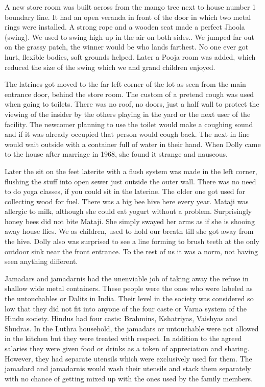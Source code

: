 A new store room was built across from the mango tree next to house number 1 boundary line. It had an open veranda in front of the door in which two metal rings were installed. A strong rope and a wooden seat made a perfect Jhoola (swing). We used to swing high up in the air on both sides.. We jumped far out on the grassy patch, the winner would be who lands farthest. No one ever got hurt, flexible bodies, soft grounds helped. 
Later a Pooja room was added, which reduced the size of the swing which we and grand children enjoyed. 

The latrines got moved to the far left corner of the lot as seen from the main entrance door, behind the store room. The custom of a pretend cough was used when going to toilets. There was no roof, no doors, just a half wall to protect the viewing of the insider by the others playing in the yard or the next user of the facility. The newcomer planning to use the toilet would make a coughing sound and if it was already occupied that person would cough back. The next in line would wait outside with a container full of water in their hand. When Dolly came to the house after marriage in 1968, she found it strange and nauseous. 

Later the sit on the feet laterite with a flush system was made in the left corner, flushing the stuff into open sewer just outside the outer wall. There was no need to do yoga classes, if you could sit in the laterine. 
The older one got used for collecting wood for fuel. 
There was a big bee hive here every year. 
Mataji was allergic to milk, although she could eat yogurt without a problem. 
Surprisingly honey bees did not bite Mataji. She simply swayed her arms as if she is shooing away house flies. We as children, used to hold our breath till she got away from the hive. 
Dolly also was surprised to see a line forming to brush teeth at the only outdoor sink near the front entrance. To the rest of us it was a norm, not having seen anything different. 

Jamadars and jamadarnis had the unenviable job of taking away the refuse in shallow wide metal containers. These people were the ones who were labeled as the untouchables or Dalits in India. Their level in the society was considered so low that they did not fit into anyone of the four caste or Varna system of the Hindu society. Hindus had four casts: Brahmins, Kshatriyas, Vaishyas and Shudras. In the Luthra household, the jamadars or untouchable were not allowed in the kitchen but they were treated with respect. In addition to the agreed salaries they were given food or drinks as a token of appreciation and sharing. However, they had separate utensils which were exclusively used for them.  The jamadard and jamadarnis would wash their utensils and stack them separately with no chance of getting mixed up with the ones used by the family members. 

